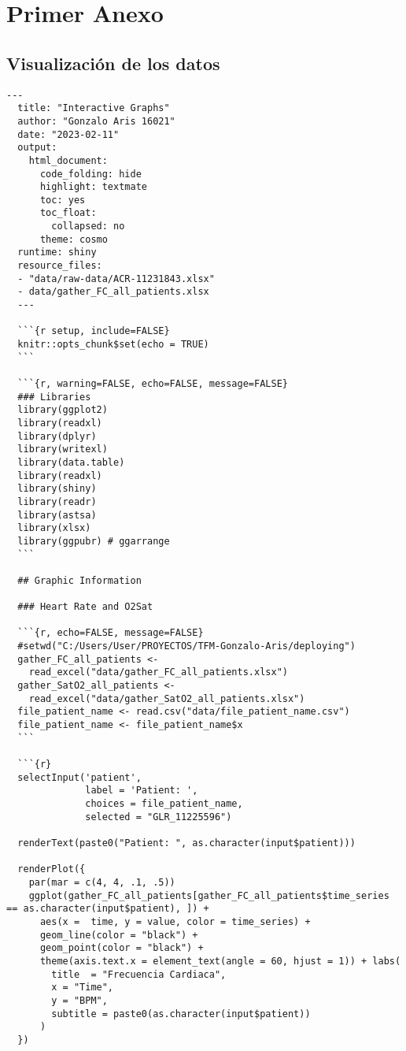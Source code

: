 \section{Primer Anexo}\label{sec:anexo1}

\subsection{Visualización de los datos}\label{sec:codigo-visualizacion}

\begin{lstlisting}[style=mystyle,caption={Código Visualización de los Datos}, label={lst:codigo-visualizacion}]
  ---
  title: "Interactive Graphs"
  author: "Gonzalo Aris 16021"
  date: "2023-02-11"
  output:
    html_document:
      code_folding: hide
      highlight: textmate
      toc: yes
      toc_float:
        collapsed: no
      theme: cosmo
  runtime: shiny
  resource_files:
  - "data/raw-data/ACR-11231843.xlsx"
  - data/gather_FC_all_patients.xlsx
  ---
  
  ```{r setup, include=FALSE}
  knitr::opts_chunk$set(echo = TRUE)
  ```
  
  ```{r, warning=FALSE, echo=FALSE, message=FALSE}
  ### Libraries
  library(ggplot2)
  library(readxl)
  library(dplyr)
  library(writexl)
  library(data.table)
  library(readxl)
  library(shiny)
  library(readr)
  library(astsa)
  library(xlsx)
  library(ggpubr) # ggarrange
  ```
  
  ## Graphic Information
  
  ### Heart Rate and O2Sat
  
  ```{r, echo=FALSE, message=FALSE}
  #setwd("C:/Users/User/PROYECTOS/TFM-Gonzalo-Aris/deploying")
  gather_FC_all_patients <-
    read_excel("data/gather_FC_all_patients.xlsx")
  gather_SatO2_all_patients <-
    read_excel("data/gather_SatO2_all_patients.xlsx")
  file_patient_name <- read.csv("data/file_patient_name.csv")
  file_patient_name <- file_patient_name$x 
  ```
  
  ```{r}
  selectInput('patient',
              label = 'Patient: ',
              choices = file_patient_name,
              selected = "GLR_11225596")
  
  renderText(paste0("Patient: ", as.character(input$patient)))
  
  renderPlot({
    par(mar = c(4, 4, .1, .5))
    ggplot(gather_FC_all_patients[gather_FC_all_patients$time_series == as.character(input$patient), ]) +
      aes(x =  time, y = value, color = time_series) +
      geom_line(color = "black") +
      geom_point(color = "black") +
      theme(axis.text.x = element_text(angle = 60, hjust = 1)) + labs(
        title  = "Frecuencia Cardiaca",
        x = "Time",
        y = "BPM",
        subtitle = paste0(as.character(input$patient))
      )
  })
  

\end{lstlisting}
